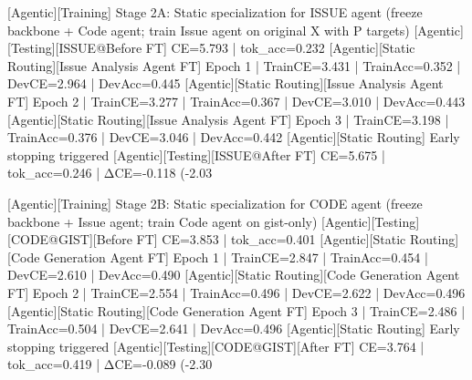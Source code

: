  [Agentic][Training] Stage 2A: Static specialization for ISSUE agent (freeze backbone + Code agent; train Issue agent on original X with P targets)
 [Agentic][Testing][ISSUE@Before FT] CE=5.793 | tok_acc=0.232
 [Agentic][Static Routing][Issue Analysis Agent FT] Epoch 1 | TrainCE=3.431 | TrainAcc=0.352 | DevCE=2.964 | DevAcc=0.445
 [Agentic][Static Routing][Issue Analysis Agent FT] Epoch 2 | TrainCE=3.277 | TrainAcc=0.367 | DevCE=3.010 | DevAcc=0.443
 [Agentic][Static Routing][Issue Analysis Agent FT] Epoch 3 | TrainCE=3.198 | TrainAcc=0.376 | DevCE=3.046 | DevAcc=0.442
 [Agentic][Static Routing] Early stopping triggered
 [Agentic][Testing][ISSUE@After FT] CE=5.675 | tok_acc=0.246 | ΔCE=-0.118 (-2.03%
 
 [Agentic][Training] Stage 2B: Static specialization for CODE agent (freeze backbone + Issue agent; train Code agent on gist-only)
 [Agentic][Testing][CODE@GIST][Before FT] CE=3.853 | tok_acc=0.401
 [Agentic][Static Routing][Code Generation Agent FT] Epoch 1 | TrainCE=2.847 | TrainAcc=0.454 | DevCE=2.610 | DevAcc=0.490
 [Agentic][Static Routing][Code Generation Agent FT] Epoch 2 | TrainCE=2.554 | TrainAcc=0.496 | DevCE=2.622 | DevAcc=0.496
 [Agentic][Static Routing][Code Generation Agent FT] Epoch 3 | TrainCE=2.486 | TrainAcc=0.504 | DevCE=2.641 | DevAcc=0.496
 [Agentic][Static Routing] Early stopping triggered
 [Agentic][Testing][CODE@GIST][After FT] CE=3.764 | tok_acc=0.419 | ΔCE=-0.089 (-2.30%
